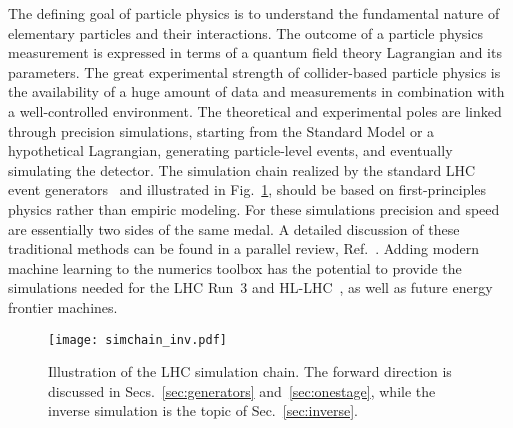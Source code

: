 \documentclass[submission,Phys]{SciPost}
\begin{document}
The defining goal of particle physics is to understand the fundamental nature of elementary particles and their interactions. The outcome of a particle physics measurement is expressed in terms of a quantum field theory Lagrangian and its parameters. The great experimental strength of collider-based particle physics is the availability of a huge amount of data and measurements in combination with a well-controlled environment. The theoretical and experimental poles are linked through precision simulations, starting from the Standard Model or a hypothetical Lagrangian, generating particle-level events, and eventually simulating the detector. The simulation chain realized by the standard LHC event generators~\cite{Sjostrand:2014zea,Sherpa:2019gpd,Alwall:2014hca,Bellm:2015jjp,Kilian:2007gr} and illustrated in Fig.~\ref{fig:simchain}, should be based on first-principles physics rather than empiric modeling. For these simulations precision and speed are essentially two sides of the same medal. A detailed discussion of these traditional methods can be found in a parallel review, Ref.~\cite{Campbell:2022qmc}. Adding modern machine learning to the numerics toolbox has the potential to provide the simulations needed for the LHC Run~3 and HL-LHC~\cite{Butter:2020tvl}, as well as future energy frontier machines. 

\begin{figure}[b!]
\centering
  \texttt{[image: simchain\_inv.pdf]}
  \caption{Illustration of the LHC simulation chain. The forward direction is discussed in Secs.~\ref{sec:generators} and~\ref{sec:onestage}, while the inverse simulation is the topic of Sec.~\ref{sec:inverse}.}
  \label{fig:simchain}
\end{figure}
\end{document}
